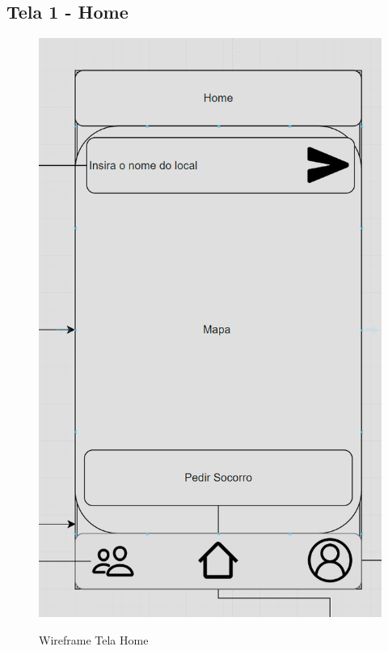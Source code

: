 \subsection{Tela 1 - Home}
\begin{figure}[h]
  \begin{center}
  \includegraphics[width=0.2\linewidth]{images/wire-tela-home.png}\\
  \end{center}
  \caption[Wireframe Tela Home]{Wireframe Tela Home}
  \label{fig:wireframe-tela-home}
\end{figure}
\pagebreak
